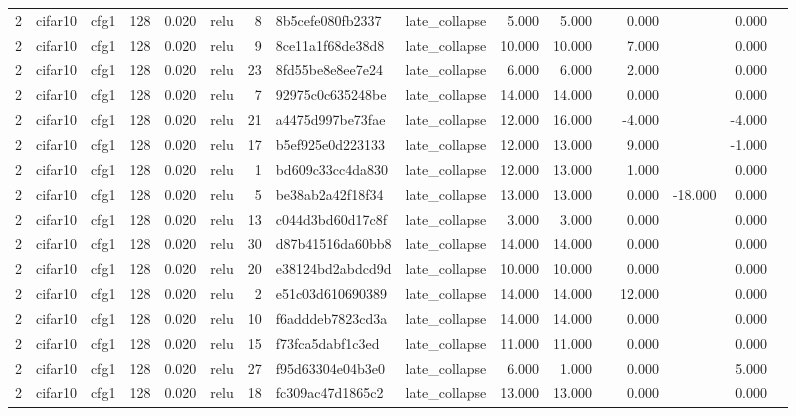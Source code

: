 \begin{table}[htbp]
{\begin{tabular}{@{}rllrrlrllrrrrrrr@{}}
2 & cifar10 & cfg1 & 128 & 0.020 & relu & 8 & 8b5cefe080fb2337 & late\_collapse & 5.000 & 5.000 &  & 0.000 &  & 0.000 &  \\
2 & cifar10 & cfg1 & 128 & 0.020 & relu & 9 & 8ce11a1f68de38d8 & late\_collapse & 10.000 & 10.000 &  & 7.000 &  & 0.000 &  \\
2 & cifar10 & cfg1 & 128 & 0.020 & relu & 23 & 8fd55be8e8ee7e24 & late\_collapse & 6.000 & 6.000 &  & 2.000 &  & 0.000 &  \\
2 & cifar10 & cfg1 & 128 & 0.020 & relu & 7 & 92975c0c635248be & late\_collapse & 14.000 & 14.000 &  & 0.000 &  & 0.000 &  \\
2 & cifar10 & cfg1 & 128 & 0.020 & relu & 21 & a4475d997be73fae & late\_collapse & 12.000 & 16.000 &  & -4.000 &  & -4.000 &  \\
2 & cifar10 & cfg1 & 128 & 0.020 & relu & 17 & b5ef925e0d223133 & late\_collapse & 12.000 & 13.000 &  & 9.000 &  & -1.000 &  \\
2 & cifar10 & cfg1 & 128 & 0.020 & relu & 1 & bd609c33cc4da830 & late\_collapse & 12.000 & 13.000 &  & 1.000 &  & 0.000 &  \\
2 & cifar10 & cfg1 & 128 & 0.020 & relu & 5 & be38ab2a42f18f34 & late\_collapse & 13.000 & 13.000 &  & 0.000 & -18.000 & 0.000 &  \\
2 & cifar10 & cfg1 & 128 & 0.020 & relu & 13 & c044d3bd60d17c8f & late\_collapse & 3.000 & 3.000 &  & 0.000 &  & 0.000 &  \\
2 & cifar10 & cfg1 & 128 & 0.020 & relu & 30 & d87b41516da60bb8 & late\_collapse & 14.000 & 14.000 &  & 0.000 &  & 0.000 &  \\
2 & cifar10 & cfg1 & 128 & 0.020 & relu & 20 & e38124bd2abdcd9d & late\_collapse & 10.000 & 10.000 &  & 0.000 &  & 0.000 &  \\
2 & cifar10 & cfg1 & 128 & 0.020 & relu & 2 & e51c03d610690389 & late\_collapse & 14.000 & 14.000 &  & 12.000 &  & 0.000 &  \\
2 & cifar10 & cfg1 & 128 & 0.020 & relu & 10 & f6adddeb7823cd3a & late\_collapse & 14.000 & 14.000 &  & 0.000 &  & 0.000 &  \\
2 & cifar10 & cfg1 & 128 & 0.020 & relu & 15 & f73fca5dabf1c3ed & late\_collapse & 11.000 & 11.000 &  & 0.000 &  & 0.000 &  \\
2 & cifar10 & cfg1 & 128 & 0.020 & relu & 27 & f95d63304e04b3e0 & late\_collapse & 6.000 & 1.000 &  & 0.000 &  & 5.000 &  \\
2 & cifar10 & cfg1 & 128 & 0.020 & relu & 18 & fc309ac47d1865c2 & late\_collapse & 13.000 & 13.000 &  & 0.000 &  & 0.000 &  \\

\end{tabular}}
\end{table}
